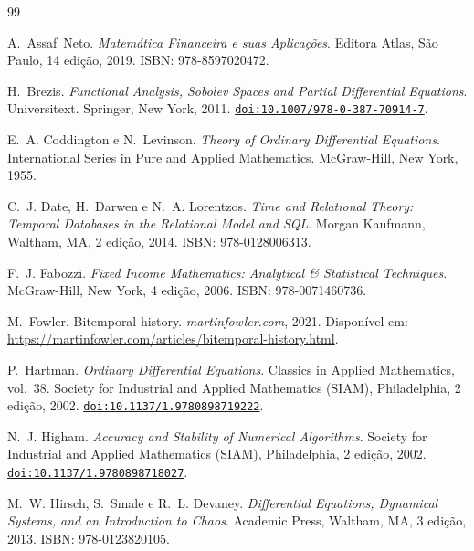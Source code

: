 \documentclass[11pt, a4paper]{article}
\newcommand{\doi}[1]{\href{https://doi.org/#1}{\texttt{doi:#1}}}
\theoremstyle{definition}
\theoremstyle{plain}
\theoremstyle{remark}
\begin{document}
\begin{thebibliography}{99}

A.~Assaf~Neto.
\newblock \emph{Matem{\'a}tica Financeira e suas Aplica{\c{c}}{\~o}es}.
\newblock Editora Atlas, S{\~a}o Paulo, 14{\textordfeminine} edi{\c{c}}{\~a}o, 2019.
\newblock ISBN: 978-8597020472.

H.~Brezis.
\newblock \emph{Functional Analysis, Sobolev Spaces and Partial Differential Equations}.
\newblock Universitext. Springer, New York, 2011.
\newblock \doi{10.1007/978-0-387-70914-7}.

E.~A. Coddington e N.~Levinson.
\newblock \emph{Theory of Ordinary Differential Equations}.
\newblock International Series in Pure and Applied Mathematics. McGraw-Hill, New York, 1955.

C.~J. Date, H.~Darwen e N.~A. Lorentzos.
\newblock \emph{Time and Relational Theory: Temporal Databases in the Relational Model and SQL}.
\newblock Morgan Kaufmann, Waltham, MA, 2{\textordfeminine} edi{\c{c}}{\~a}o, 2014.
\newblock ISBN: 978-0128006313.

F.~J. Fabozzi.
\newblock \emph{Fixed Income Mathematics: Analytical \& Statistical Techniques}.
\newblock McGraw-Hill, New York, 4{\textordfeminine} edi{\c{c}}{\~a}o, 2006.
\newblock ISBN: 978-0071460736.

M.~Fowler.
\newblock Bitemporal history.
\newblock \emph{martinfowler.com}, 2021.
\newblock Dispon{\'i}vel em: \url{https://martinfowler.com/articles/bitemporal-history.html}.

P.~Hartman.
\newblock \emph{Ordinary Differential Equations}.
\newblock Classics in Applied Mathematics, vol.~38. Society for Industrial and Applied Mathematics (SIAM), Philadelphia, 2{\textordfeminine} edi{\c{c}}{\~a}o, 2002.
\newblock \doi{10.1137/1.9780898719222}.

N.~J. Higham.
\newblock \emph{Accuracy and Stability of Numerical Algorithms}.
\newblock Society for Industrial and Applied Mathematics (SIAM), Philadelphia, 2{\textordfeminine} edi{\c{c}}{\~a}o, 2002.
\newblock \doi{10.1137/1.9780898718027}.

M.~W. Hirsch, S.~Smale e R.~L. Devaney.
\newblock \emph{Differential Equations, Dynamical Systems, and an Introduction to Chaos}.
\newblock Academic Press, Waltham, MA, 3{\textordfeminine} edi{\c{c}}{\~a}o, 2013.
\newblock ISBN: 978-0123820105.


\end{thebibliography}
\end{document}
